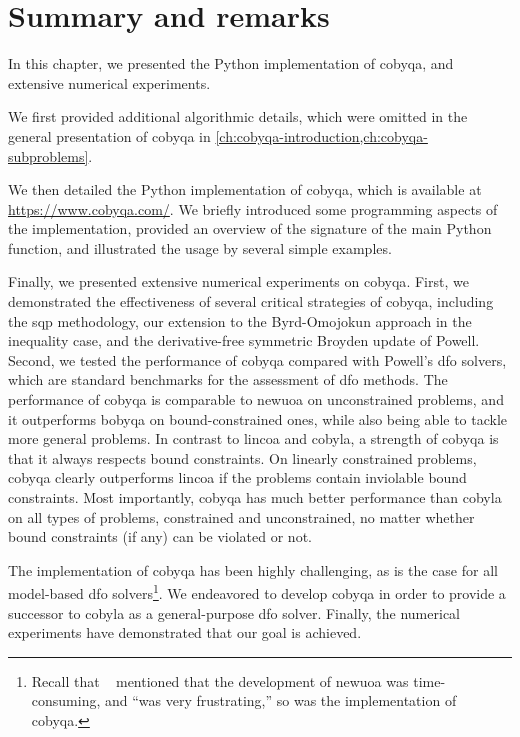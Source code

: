 \section{Summary and remarks}

In this chapter, we presented the Python implementation of \gls{cobyqa}, and extensive numerical experiments.

We first provided additional algorithmic details, which were omitted in the general presentation of \gls{cobyqa} in \cref{ch:cobyqa-introduction,ch:cobyqa-subproblems}.

We then detailed the Python implementation of \gls{cobyqa}, which is available at \url{https://www.cobyqa.com/}.
We briefly introduced some programming aspects of the implementation, provided an overview of the signature of the main Python function, and illustrated the usage by several simple examples.

Finally, we presented extensive numerical experiments on \gls{cobyqa}.
First, we demonstrated the effectiveness of several critical strategies of \gls{cobyqa}, including the \gls{sqp} methodology, our extension to the Byrd-Omojokun approach in the inequality case, and the derivative-free symmetric Broyden update of Powell.
Second, we tested the performance of \gls{cobyqa} compared with Powell's \gls{dfo} solvers, which are standard benchmarks for the assessment of \gls{dfo} methods.
The performance of \gls{cobyqa} is comparable to \gls{newuoa} on unconstrained problems, and it outperforms \gls{bobyqa} on bound-constrained ones, while also being able to tackle more general problems.
In contrast to \gls{lincoa} and \gls{cobyla}, a strength of \gls{cobyqa} is that it always respects bound constraints.
On linearly constrained problems, \gls{cobyqa} clearly outperforms \gls{lincoa} if the problems contain inviolable bound constraints.
Most importantly, \gls{cobyqa} has much better performance than \gls{cobyla} on all types of problems, constrained and unconstrained, no matter whether bound constraints (if any) can be violated or not.

The implementation of \gls{cobyqa} has been highly challenging, as is the case for all model-based \gls{dfo} solvers\footnote{Recall that \citeauthor{Powell_2006}~\cite{Powell_2006} mentioned that the development of \gls{newuoa} was time-consuming, and \enquote{was very frustrating,} so was the implementation of \gls{cobyqa}.}.
We endeavored to develop \gls{cobyqa} in order to provide a successor to \gls{cobyla} as a general-purpose \gls{dfo} solver.
Finally, the numerical experiments have demonstrated that our goal is achieved.
